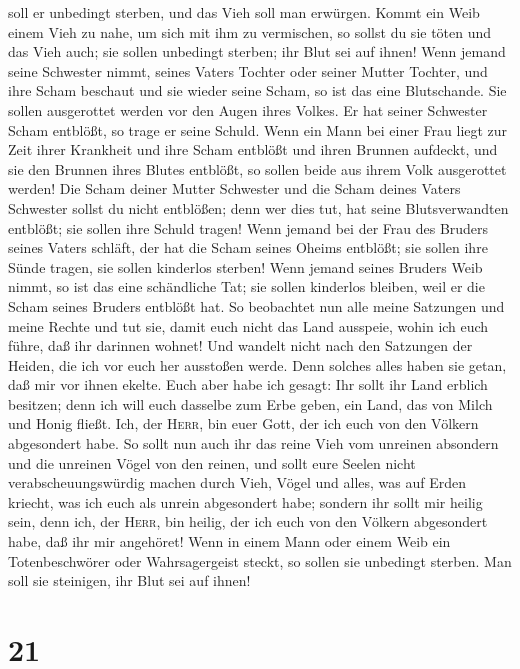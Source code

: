 soll er unbedingt sterben, und das Vieh soll man erwürgen.
 Kommt ein Weib einem Vieh zu nahe, um sich mit ihm zu
vermischen, so sollst du sie töten und das Vieh auch; sie sollen
unbedingt sterben; ihr Blut sei auf ihnen!  Wenn jemand
seine Schwester nimmt, seines Vaters Tochter oder seiner Mutter Tochter,
und ihre Scham beschaut und sie wieder seine Scham, so ist das eine
Blutschande. Sie sollen ausgerottet werden vor den Augen ihres Volkes.
Er hat seiner Schwester Scham entblößt, so trage er seine Schuld.
 Wenn ein Mann bei einer Frau liegt zur Zeit ihrer
Krankheit und ihre Scham entblößt und ihren Brunnen aufdeckt, und sie
den Brunnen ihres Blutes entblößt, so sollen beide aus ihrem Volk
ausgerottet werden!  Die Scham deiner Mutter Schwester
und die Scham deines Vaters Schwester sollst du nicht entblößen; denn
wer dies tut, hat seine Blutsverwandten entblößt; sie sollen ihre Schuld
tragen!  Wenn jemand bei der Frau des Bruders seines
Vaters schläft, der hat die Scham seines Oheims entblößt; sie sollen
ihre Sünde tragen, sie sollen kinderlos sterben!  Wenn
jemand seines Bruders Weib nimmt, so ist das eine schändliche Tat; sie
sollen kinderlos bleiben, weil er die Scham seines Bruders entblößt hat.
 So beobachtet nun alle meine Satzungen und meine Rechte
und tut sie, damit euch nicht das Land ausspeie, wohin ich euch führe,
daß ihr darinnen wohnet!  Und wandelt nicht nach den
Satzungen der Heiden, die ich vor euch her ausstoßen werde. Denn solches
alles haben sie getan, daß mir vor ihnen ekelte.  Euch
aber habe ich gesagt: Ihr sollt ihr Land erblich besitzen; denn ich will
euch dasselbe zum Erbe geben, ein Land, das von Milch und Honig fließt.
Ich, der \textsc{Herr}, bin euer Gott, der ich euch von den Völkern
abgesondert habe.  So sollt nun auch ihr das reine Vieh
vom unreinen absondern und die unreinen Vögel von den reinen, und sollt
eure Seelen nicht verabscheuungswürdig machen durch Vieh, Vögel und
alles, was auf Erden kriecht, was ich euch als unrein abgesondert habe;
 sondern ihr sollt mir heilig sein, denn ich, der
\textsc{Herr}, bin heilig, der ich euch von den Völkern abgesondert
habe, daß ihr mir angehöret!  Wenn in einem Mann oder
einem Weib ein Totenbeschwörer oder Wahrsagergeist steckt, so sollen sie
unbedingt sterben. Man soll sie steinigen, ihr Blut sei auf ihnen!

\hypertarget{section-20}{%
\section{21}\label{section-20}}

